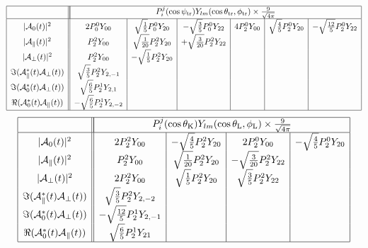 \documentclass[a4paper,9pt,twoside]{article}
\def\thetatr{\theta_\mathrm{tr}}
\def\phitr{\phi_\mathrm{tr}}
\def\psitr{\psi_\mathrm{tr}}
\def\thetaK{\theta_\mathrm{K}}
\def\thetaL{\theta_\mathrm{L}}
\def\phiL{\phi_\mathrm{L}}
\begin{document}
\begin{equation}
\begin{array}{|c|| c | c | c | c | c | c |}
 \hline
&\multicolumn{6}{|c|}{ P_i^j(\cos\psitr)Y_{lm}(\cos\thetatr,\phitr) \times \frac{9}{\sqrt{4\pi}} } \\
 \hline
|{\cal A}_0(t)|^2                       &  2 P_0^0Y_{00}  & \sqrt{\frac{1}{5}} P_0^0 Y_{20} & -\sqrt{\frac{3}{5}} P_0^0 Y_{22}
                                        &  4 P_2^0Y_{00}  & \sqrt{\frac{4}{5}} P_2^0 Y_{20} & -\sqrt{\frac{12}{5}} P_2^0 Y_{22} \\
|{\cal A}_\parallel(t)|^2               &    P_2^2Y_{00} &  \sqrt{\frac{1}{20}} P_2^2 Y_{20} & +\sqrt{\frac{3}{20}} P_2^2Y_{22} & && \\
|{\cal A}_\perp(t)|^2                   &  P_2^2 Y_{00} & -\sqrt{\frac{1}{5}} P_2^2 Y_{20} &                                 &&& \\
\Im({\cal A}_\parallel^*(t){\cal A}_\perp(t)) &  \sqrt{\frac{3}{5}} P_2^2 Y_{2,-1} &&&&&\\
\Im({\cal A}_0^*(t){\cal A}_\perp(t))         &  \sqrt{\frac{6}{5}} P_2^1 Y_{2,1} &&&&&\\
\Re({\cal A}_0^*(t){\cal A}_\parallel(t))     & -\sqrt{\frac{6}{5}} P_2^1 Y_{2,-2} &&&&&\\
 \hline
\end{array}
\end{equation}
\begin{equation}
\begin{array}{|c|| c | c | c | c | }
 \hline
&\multicolumn{4}{|c|}{ P_i^j(\cos\thetaK)Y_{lm}(\cos\thetaL,\phiL) \times \frac{9}{\sqrt{4\pi}} } \\
 \hline
|{\cal A}_0(t)|^2                       & 2P_2^2Y_{00} & -\sqrt{\frac{4}{5}}P_2^2Y_{20} & 2P_2^0Y_{00} & -\sqrt{\frac{4}{5}} P_2^0Y_{20}  \\
|{\cal A}_\parallel(t)|^2               & P_2^2Y_{00} &\sqrt{\frac{1}{20}} P_2^2Y_{20} &-\sqrt{\frac{3}{20}}P_2^2Y_{22} & \\
|{\cal A}_\perp(t)|^2                   & 2P_2^2Y_{00} & \sqrt{\frac{1}{5}} P_2^2Y_{20} &\sqrt{\frac{3}{5}}P_2^2Y_{22} & \\
\Im({\cal A}_\parallel^*(t){\cal A}_\perp(t)) & \sqrt{\frac{3}{5}}P_2^2Y_{2,-2}&&&\\
\Im({\cal A}_0^*(t){\cal A}_\perp(t))         & -\sqrt{\frac{12}{5}}P_2^1Y_{2,-1}&&&\\
\Re({\cal A}_0^*(t){\cal A}_\parallel(t))     & \sqrt{\frac{6}{5}}P_2^1Y_{21}&&&\\
 \hline
\end{array}
\end{equation}
\end{document}

